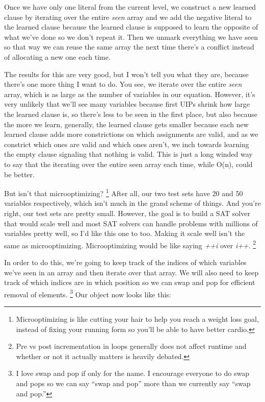 Once we have only one literal from the current level, we construct a new learned clause 
by iterating over the entire \textit{seen} array and we add the negative literal to the 
learned clause because the learned clause is supposed to learn the opposite of what we've 
done so we don't repeat it. Then we unmark everything we have seen so that way we can reuse 
the same array the next time there's a conflict instead of allocating a new one each time. 

The results for this are very good, but I won't tell you what they are, because there's 
one more thing I want to do. You see, we iterate over the entire \textit{seen} array,
which is as large as the number of variables in our equation. However, it's very unlikely 
that we'll see many variables because first UIPs shrink how large the learned clause is, 
so there's less to be seen in the first place, but also because the more we learn, generally,
the learned clause gets smaller because each new learned clause adds more constrictions on 
which assignments are valid, and as we constrict which ones are valid and which ones aren't,
we inch towards learning the empty clause signaling that nothing is valid. This is just a 
long winded way to say that the iterating over the entire seen array each time, while O(n),
could be better.

But isn't that microoptimizing?
\footnote{Microoptimizing is like cutting your hair to help you reach a weight loss goal, 
instead of fixing your running form so you'll be able to have better cardio.}
After all, our two test sets have 20 and 50 variables 
respectively, which isn't much in the grand scheme of things. And you're right, our test 
sets are pretty small. However, the goal is to build a SAT solver that would scale well 
and most SAT solvers can handle problems with millions of variables pretty well, so I'd 
like this one to too. Making it scale well isn't the same as microoptimizing. Microoptimizing 
would be like saying \textit{++i} over \textit{i++}.
\footnote{Pre vs post incrementation in loops generally does not affect runtime and whether 
or not it actually matters is heavily debated.}

In order to do this, we're going to keep track of the indices of which variables we've
seen in an array and then iterate over that array. We will also need to keep track of 
which indices are in which position so we can swap and pop for efficient removal of 
elements.
\footnote{I love swap and pop if only for the name. I encourage everyone to do swap and 
pops so we can say ``swap and pop'' more than we currently say ``swap and pop.''}
Our object now looks like this:

